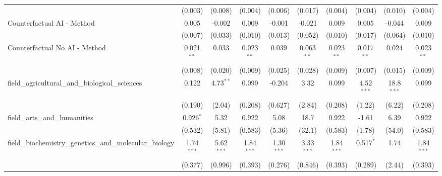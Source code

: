 \begin{tabular}{lccccccccc}
                                                               & (0.003)        & (0.008)        & (0.004)       & (0.006)       & (0.017)        & (0.004)       & (0.004)       & (0.010)       & (0.004)\\   
   Counterfactual AI - Method                                  & 0.005          & -0.002         & 0.009         & -0.001        & -0.021         & 0.009         & 0.005         & -0.044        & 0.009\\   
                                                               & (0.007)        & (0.033)        & (0.010)       & (0.013)       & (0.052)        & (0.010)       & (0.017)       & (0.064)       & (0.010)\\   
   Counterfactual No AI - Method                               & 0.021$^{**}$   & 0.033          & 0.023$^{**}$  & 0.039         & 0.063$^{**}$   & 0.023$^{**}$  & 0.017$^{**}$  & 0.024         & 0.023$^{**}$\\   
                                                               & (0.008)        & (0.020)        & (0.009)       & (0.025)       & (0.028)        & (0.009)       & (0.007)       & (0.015)       & (0.009)\\   
   field\_agricultural\_and\_biological\_sciences              & 0.122          & 4.73$^{**}$    & 0.099         & -0.204        & 3.32           & 0.099         & 4.52$^{***}$  & 18.8$^{***}$  & 0.099\\   
                                                               & (0.190)        & (2.04)         & (0.208)       & (0.627)       & (2.84)         & (0.208)       & (1.22)        & (6.22)        & (0.208)\\   
   field\_arts\_and\_humanities                                & 0.926$^{*}$    & 5.32           & 0.922         & 5.08          & 18.7           & 0.922         & -1.61         & 6.39          & 0.922\\   
                                                               & (0.532)        & (5.81)         & (0.583)       & (5.36)        & (32.1)         & (0.583)       & (1.78)        & (54.0)        & (0.583)\\   
   field\_biochemistry\_genetics\_and\_molecular\_biology      & 1.74$^{***}$   & 5.62$^{***}$   & 1.84$^{***}$  & 1.30$^{***}$  & 3.33$^{***}$   & 1.84$^{***}$  & 0.517$^{*}$   & 1.74          & 1.84$^{***}$\\   
                                                               & (0.377)        & (0.996)        & (0.393)       & (0.276)       & (0.846)        & (0.393)       & (0.289)       & (2.44)        & (0.393)\\   

\end{tabular}
